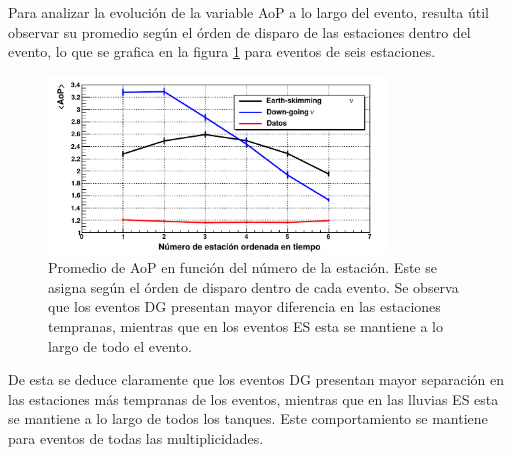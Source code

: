 	Para analizar la evolución de la variable AoP a lo largo del evento, resulta útil observar su promedio según el órden de disparo de las estaciones dentro del evento, lo que se grafica en la figura \ref{fig:aop_vs_NStation} para eventos de seis estaciones.
	\begin{figure}[ht!]
		\begin{center}
		\includegraphics[width=0.8\textwidth]{fig/seleccionAuger/aop_vs_NStation}
		\caption{Promedio de AoP en función del número de la estación. Este se asigna según el órden de disparo dentro de cada evento. Se observa que los eventos DG presentan mayor diferencia en las estaciones tempranas, mientras que en los eventos ES esta se mantiene a lo largo de todo el evento.}
		\label{fig:aop_vs_NStation}
		\end{center}
	\end{figure}
	De esta se deduce claramente que los eventos DG presentan mayor separación en las estaciones más tempranas de los eventos, mientras que en las lluvias ES esta se mantiene a lo largo de todos los tanques.
	Este comportamiento se mantiene para eventos de todas las multiplicidades.
	
